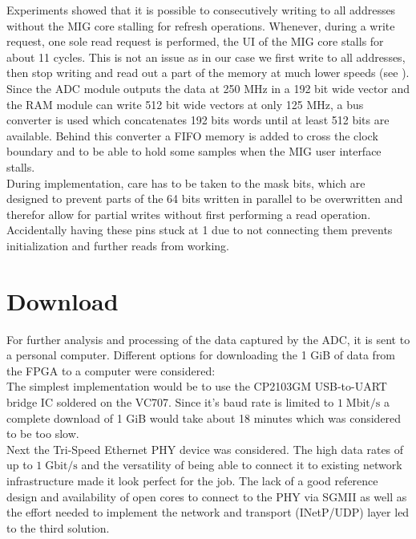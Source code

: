 Experiments showed that it is possible to consecutively writing to all
addresses without the \gls{MIG} core stalling for refresh operations.
Whenever, during a write request, one sole read request
is performed, the \gls{UI} of the \gls{MIG} core stalls for about 11
cycles. This is not an issue as in our case we first write
to all addresses, then stop writing and read out a part of the memory
at much lower speeds (see ). \\

Since the \gls{ADC} module outputs the data at 250 MHz in a 192 bit
wide vector and the \gls{RAM} module can write 512 bit wide vectors
at only 125 MHz, a bus converter is used which concatenates 192 bits
words until at least 512 bits are available. Behind this converter
a \gls{FIFO} memory is added to cross the clock boundary and to be able
to hold some samples when the \gls{MIG} user interface stalls. \\

During implementation, care has to be taken to the mask bits,
which are designed to prevent parts of the 64 bits written in parallel to be
overwritten and therefor allow for partial writes without first performing
a read operation. Accidentally having these pins stuck at 1 due to
not connecting them prevents initialization and further reads from
working. \\

\section{Download}
\label{sec:fpga_download}
For further analysis and processing of the data captured by the \gls{ADC},
it is sent to a personal computer.
Different options for downloading the 1 GiB of data from the \gls{FPGA}
to a computer were considered: \\

The simplest implementation would be to use the CP2103GM
\acrshort{USB}-to-\acrshort{UART} bridge \gls{IC} soldered on the VC707.
Since it's baud rate is limited to $1 \;\text{Mbit}/\text{s}$
a complete download of 1 GiB would take about 18 minutes which was
considered to be too slow. \\

Next the Tri-Speed Ethernet \gls{PHY} device was considered.
The high data rates of up to $1 \;\text{Gbit}/\text{s}$ and the versatility
of being able to connect it to existing network infrastructure made
it look perfect for the job. The lack of a good reference design and
availability of open cores to connect to the \gls{PHY} via
\gls{SGMII} as well as the effort needed to implement
the network and transport (\gls{INetP}/\gls{UDP}) layer
led to the third solution. \\

